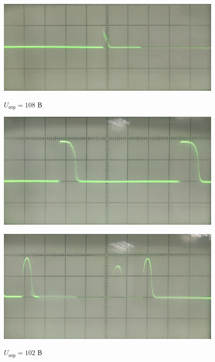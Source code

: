 \begin{figure}[h]
	\begin{minipage}[h]{0.45\linewidth}
		\centering
		\includegraphics[width=\textwidth]{img/img7}
		\caption{$U_{\text{отр}}=108$ В}
		\label{fig:img7}
	\end{minipage}
	\hfill
	\begin{minipage}[h]{0.45\linewidth}
		\centering
		{\includegraphics[width=\textwidth]{img/img8}}
		\caption{$U_{\text{отр}}=102$ В}
		\label{fig:img8}
	\end{minipage}
	\vfill
	\vspace{1em}
	\begin{minipage}[h]{0.45\linewidth}
		\centering
		{\includegraphics[width=\textwidth]{img/img9}}

\end{minipage}
\end{figure}
